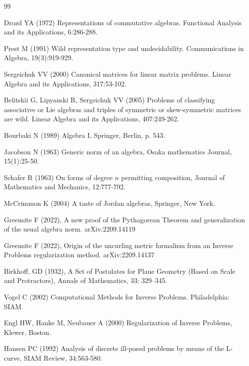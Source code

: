 \documentclass{amsart}
\numberwithin{equation}{section}
\theoremstyle{definition}
\numberwithin{theorem}{section}
\begin{document}
   \begin{thebibliography}{99}
   
 
   
     Drozd YA (1972) Representations of commutative algebras. Functional Analysis and its Applications, 6:286-288.
   
        Prest M (1991) Wild representation type and undecidability.  Communications in Algebra, 19(3):919-929.
       
              Sergeichuk VV (2000) Canonical matrices for linear matrix problems.  Linear Algebra and its Applications, 317:53-102.

       
        Belitskii G, Lipyanski R, Sergeichuk VV (2005) Problems of classifying associative or Lie algebras and triples of symmetric or skew-symmetric matrices are wild.  Linear Algebra and its Applications, 407:249-262.
                            
   Bourbaki N (1989) Algebra I, Springer, Berlin, p. 543.
  
               Jacobson N  (1963) Generic norm of an algebra, Osaka mathematics Journal, 15(1):25-50.
  
          Schafer R (1963) On forms of degree $n$ permitting composition, Journal of Mathematics and Mechanics, 12:777-792. 
         
      
        McCrimmon K (2004) A taste of Jordan algebras, Springer, New York.
       
 
       
               Greensite F (2022), A new proof of the Pythagorean Theorem and generalization of the usual algebra norm. arXiv:2209.14119
              
                     Greensite F (2022), Origin of the uncurling metric formalism from an Inverse Problems regularization method. arXiv:2209.14137
 
   
          Birkhoff, GD (1932), A Set of Postulates for Plane Geometry (Based on Scale and Protractors), Annals of Mathematics, 33: 329–345.
         
                Vogel C (2002) Computational Methods for Inverse Problems. Philadelphia: SIAM.
      
        Engl HW,  Hanke M,  Neubauer A (2000) Regularization of Inverse Problems, Klewer, Boston.
      
      \enlargethispage{1cm}
      
       Hansen PC (1992) Analysis of discrete ill-posed problems by means of the L-curve, SIAM Review, 34:563-580.
      
       
      \end{thebibliography}
  
  
   
\end{document}
